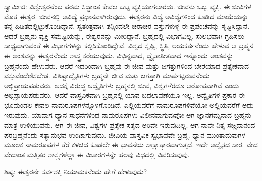 ಸ್ವಾಮೀಜಿ: ವಿಶ್ವೇಶ್ವರನೆಂಬ ಪರಮ ಸಿದ್ಧಾಂತ ಕೇವಲ ಒಬ್ಬ ವ್ಯಕ್ತಿಯಾಗಲಾರದು. ಜೀವನು ಒಬ್ಬ ವ್ಯಕ್ತಿ. ಈ ಜೀವಿಗಳ ಮೊತ್ತ ಈಶ್ವರ. ಜೀವನಲ್ಲಿ ಅವಿದ್ಯೆ ಪ್ರಧಾನವಾಗಿರುವುದು. ಈಶ್ವರನು ವಿದ್ಯೆ ಅವಿದ್ಯೆಗಳಿಂದ ಕೂಡಿದ ಮಾಯೆಯನ್ನು ತನ್ನ ಹಿಡಿತದಲ್ಲಿಟ್ಟುಕೊಂಡಿದ್ದಾನೆ. ಸ್ವತಂತ್ರವಾಗಿ ತನ್ನಿಂದಲೇ ಚರಾಚರ ವಸ್ತುಗಳುಳ್ಳ ಈ ಪ್ರಪಂಚವನ್ನು ಸೃಷ್ಟಿಸಿದ್ದಾನೆ. ಆದರೆ ಬ್ರಹ್ಮನು ವ್ಯಕ್ತಿ ಸಮಷ್ಟಿಯನ್ನು, ಈಶ್ವರನನ್ನು ಮೀರಿದ್ದಾನೆ. ಬ್ರಹ್ಮದಲ್ಲಿ ವಿಭಾಗವಿಲ್ಲ. ಸುಲಭವಾಗಿ ಗ್ರಹಿಸಲು ಸಾಧ್ಯವಾಗುವಂತೆ ಈ ವಿಭಾಗಗಳನ್ನು ಕಲ್ಪಿಸಿಕೊಂಡಿದ್ದೇವೆ. ವಿಶ್ವದ ಸೃಷ್ಟಿ, ಸ್ಥಿತಿ, ಲಯಕರ್ತನೆಂದು ಹೇಳುವ ಆ ಬ್ರಹ್ಮನ ಈ ಅಂಶವನ್ನು ಈಶ್ವರನೆಂದು ಶಾಸ್ತ್ರ ಕರೆಯುವುದು. ವಿಭಿನ್ನವಾದ, ದ್ವೈತಾತೀತವಾದ ಇನ್ನೊಂದು ಅಂಶವನ್ನು ಬ್ರಹ್ಮನೆಂದು ಹೇಳುವರು. ಆದರೆ ಇದರಿಂದಾಗಿ ಬ್ರಹ್ಮವು ಈ ಜೀವ ಮತ್ತು ಜಗತ್ತುಗಳಿಂದ ಬೇರೆಯಾದ ಪ್ರತ್ಯೇಕವಾದ ವಸ್ತುವೆಂದೆಣಿಸಬೇಡ. ವಿಶಿಷ್ಟಾದ್ವೈತಿಗಳು ಬ್ರಹ್ಮನೇ ಜೀವ ಮತ್ತು ಜಗತ್ತಾಗಿ ಮಾರ್ಪಟ್ಟಿರುವನೆಂದು ಅಭಿಪ್ರಾಯಪಡುವರು. ಅದಕ್ಕೆ ವಿರುದ್ಧ ಅದ್ವೈತಿಗಳು ಬ್ರಹ್ಮನಲ್ಲಿ ಜೀವ, ವಿಶ್ವಗಳೆರಡೂ ಆರೋಪವಾಗಿವೆ ಎಂದು ಅಭಿಪ್ರಾಯಪಡುವರು. ಆದರೆ ವಾಸ್ತವಿಕವಾಗಿ ಬ್ರಹ್ಮನಲ್ಲಿ ಯಾವ ಬದಲಾವಣೆಯೂ ಇಲ್ಲ. ಅದ್ವೈತಿಗಳ ಪ್ರಕಾರ ಈ ಭೂಮಂಡಲ ಕೇವಲ ನಾಮರೂಪಗಳನ್ನೊಳಗೊಂಡಿದೆ. ಎಲ್ಲಿಯವರೆಗೆ ನಾಮರೂಪಗಳಿವೆಯೋ ಅಲ್ಲಿಯವರೆಗೆ ಅದು ಇರುವುದು. ಯಾವಾಗ ಧ್ಯಾನ ಸಾಧನೆಗಳಿಂದ ನಾಮರೂಪಗಳು ವಿಲೀನವಾಗುವುವೋ ಆಗ ಜ್ಞಾನಗಮ್ಯನಾದ ಬ್ರಹ್ಮನು ಮಾತ್ರ ಉಳಿಯುವನು. ಆಗ ಈ ಜೀವ, ವಿಶ್ವಗಳ ಪ್ರತ್ಯೇಕ ಸತ್ಯದ ಅರಿವೇ ಇರುವುದಿಲ್ಲ. ಆಗ ನಾನೇ ನಿತ್ಯ ಸಚ್ಚಿದಾನಂದ ಪರಬ್ರಹ್ಮನೆಂದು ಸತ್ಯಾನುಭವ ಉಂಟಾಗುವುದು. ಜೀವಿಯ ವಾಸ್ತವಿಕ ಸ್ವಭಾವವೇ ಬ್ರಹ್ಮ. ಧ್ಯಾನ ಮುಂತಾದುವುಗಳ ಮೂಲಕ ನಾಮರೂಪಗಳ ತೆರೆ ಕಳಚಿದ ಕೂಡಲೇ ಈ ಭಾವನೆಯ ಸಾಕ್ಷಾತ್ಕಾರವಾಗುತ್ತದೆ. ಇದೇ ಅದ್ವೈತದ ಸಾರ. ವೇದ ವೇದಾಂತ ಮತ್ತಿತರ ಶಾಸ್ತ್ರಗಳೆಲ್ಲಾ ಈ ವಿಚಾರಗಳನ್ನೇ ಹಲವು ವಿಧದಲ್ಲಿ ವಿವರಿಸುವುವು.

ಶಿಷ್ಯ: ಈಶ್ವರನೇ ಸರ್ವಶಕ್ತಿ ನಿಯಾಮಕನೆಂದು ಹೇಗೆ ಹೇಳುವುದು?


